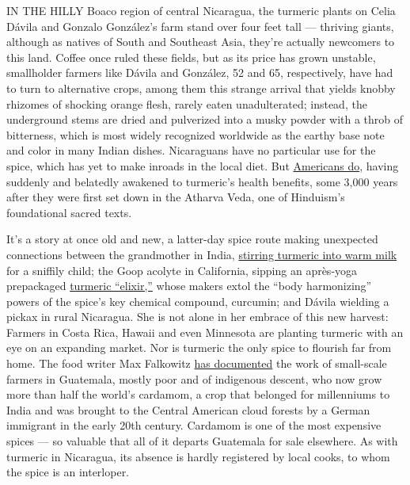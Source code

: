 IN THE HILLY Boaco region of central Nicaragua, the turmeric plants on
Celia Dávila and Gonzalo González's farm stand over four feet tall ---
thriving giants, although as natives of South and Southeast Asia,
they're actually newcomers to this land. Coffee once ruled these fields,
but as its price has grown unstable, smallholder farmers like Dávila and
González, 52 and 65, respectively, have had to turn to alternative
crops, among them this strange arrival that yields knobby rhizomes of
shocking orange flesh, rarely eaten unadulterated; instead, the
underground stems are dried and pulverized into a musky powder with a
throb of bitterness, which is most widely recognized worldwide as the
earthy base note and color in many Indian dishes. Nicaraguans have no
particular use for the spice, which has yet to make inroads in the local
diet. But
\href{https://cooking.nytimes3xbfgragh.onion/tag/turmeric}{Americans
do}, having suddenly and belatedly awakened to turmeric's health
benefits, some 3,000 years after they were first set down in the Atharva
Veda, one of Hinduism's foundational sacred texts.

It's a story at once old and new, a latter-day spice route making
unexpected connections between the grandmother in India,
\href{https://www.nytimes3xbfgragh.onion/2017/01/19/magazine/a-grandmothers-secret-turmeric-prescription.html}{stirring
turmeric into warm milk} for a sniffily child; the Goop acolyte in
California, sipping an après-yoga prepackaged
\href{https://www.nytimes3xbfgragh.onion/2018/01/05/t-magazine/matilda-goad-turmeric-elixir-recipe.html}{turmeric
``elixir,''} whose makers extol the ``body harmonizing'' powers of the
spice's key chemical compound, curcumin; and Dávila wielding a pickax in
rural Nicaragua. She is not alone in her embrace of this new harvest:
Farmers in Costa Rica, Hawaii and even Minnesota are planting turmeric
with an eye on an expanding market. Nor is turmeric the only spice to
flourish far from home. The food writer Max Falkowitz
\href{https://www.saveur.com/cardamom-trade-in-guatemala/}{has
documented} the work of small-scale farmers in Guatemala, mostly poor
and of indigenous descent, who now grow more than half the world's
cardamom, a crop that belonged for millenniums to India and was brought
to the Central American cloud forests by a German immigrant in the early
20th century. Cardamom is one of the most expensive spices --- so
valuable that all of it departs Guatemala for sale elsewhere. As with
turmeric in Nicaragua, its absence is hardly registered by local cooks,
to whom the spice is an interloper.

